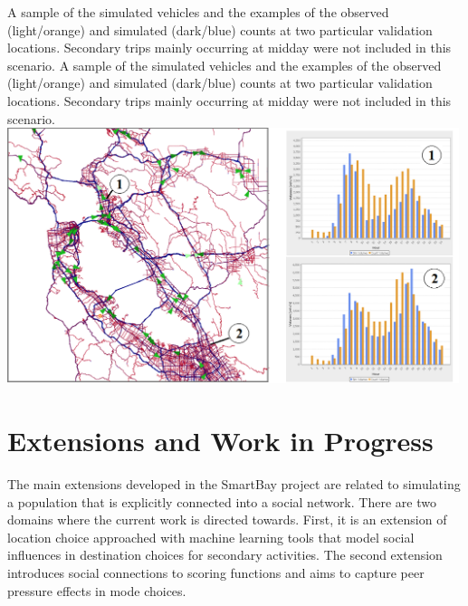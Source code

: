 \createfigure%
{A sample of the simulated vehicles and the examples of the observed (light/orange) and simulated (dark/blue) counts at two particular validation locations. Secondary trips mainly occurring at midday were not included in this scenario.}%
{A sample of the simulated vehicles and the examples of the observed (light/orange) and simulated (dark/blue) counts at two particular validation locations. Secondary trips mainly occurring at midday were not included in this scenario.}%
{\label{fig:sf_fig2}}%
{\includegraphics[width=0.99\textwidth, angle=0]{./scenarios/figures/sf_fig2.png}}%
{}

\section{Extensions and Work in Progress}
The main extensions developed in the SmartBay project are related to simulating a population that is explicitly connected into a social network. There are two domains where the current work is directed towards. First, it is an extension of location choice approached with machine learning tools that model social influences in destination choices for secondary activities. The second extension introduces social connections to scoring functions and aims to capture peer pressure effects in mode choices.

